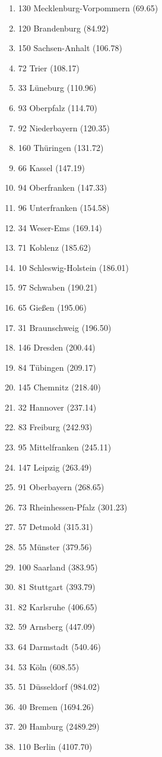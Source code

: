 \begin{enumerate}[itemsep=-6mm]
\item 130 Mecklenburg-Vorpommern (69.65)
\item 120 Brandenburg (84.92)
\item 150 Sachsen-Anhalt (106.78)
\item 72 Trier (108.17)
\item 33 Lüneburg (110.96)
\item 93 Oberpfalz (114.70)
\item 92 Niederbayern (120.35)
\item 160 Thüringen (131.72)
\item 66 Kassel (147.19)
\item 94 Oberfranken (147.33)
\item 96 Unterfranken (154.58)
\item 34 Weser-Ems (169.14)
\item 71 Koblenz (185.62)
\item 10 Schleswig-Holstein (186.01)
\item 97 Schwaben (190.21)
\item 65 Gießen (195.06)
\item 31 Braunschweig (196.50)
\item 146 Dresden (200.44)
\item 84 Tübingen (209.17)
\item 145 Chemnitz (218.40)
\item 32 Hannover (237.14)
\item 83 Freiburg (242.93)
\item 95 Mittelfranken (245.11)
\item 147 Leipzig (263.49)
\item 91 Oberbayern (268.65)
\item 73 Rheinhessen-Pfalz (301.23)
\item 57 Detmold (315.31)
\item 55 Münster (379.56)
\item 100 Saarland (383.95)
\item 81 Stuttgart (393.79)
\item 82 Karlsruhe (406.65)
\item 59 Arnsberg (447.09)
\item 64 Darmstadt (540.46)
\item 53 Köln (608.55)
\item 51 Düsseldorf (984.02)
\item 40 Bremen (1694.26)
\item 20 Hamburg (2489.29)
\item 110 Berlin (4107.70)
\end{enumerate}
